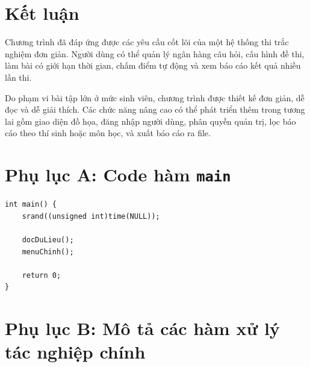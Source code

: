 \documentclass[12pt,a4paper]{article}
\begin{document}

\section{Kết luận}

Chương trình đã đáp ứng được các yêu cầu cốt lõi của một hệ thống thi trắc nghiệm đơn giản. Người dùng có thể quản lý ngân hàng câu hỏi, cấu hình đề thi, làm bài có giới hạn thời gian, chấm điểm tự động và xem báo cáo kết quả nhiều lần thi.

Do phạm vi bài tập lớn ở mức sinh viên, chương trình được thiết kế đơn giản, dễ đọc và dễ giải thích. Các chức năng nâng cao có thể phát triển thêm trong tương lai gồm giao diện đồ họa, đăng nhập người dùng, phân quyền quản trị, lọc báo cáo theo thí sinh hoặc môn học, và xuất báo cáo ra file.

\newpage


\appendix

\section{Phụ lục A: Code hàm \texttt{main}}

\begin{lstlisting}[style=cppstyle]
int main() {
    srand((unsigned int)time(NULL));

    docDuLieu();
    menuChinh();

    return 0;
}
\end{lstlisting}

\section{Phụ lục B: Mô tả các hàm xử lý tác nghiệp chính}
\end{document}
